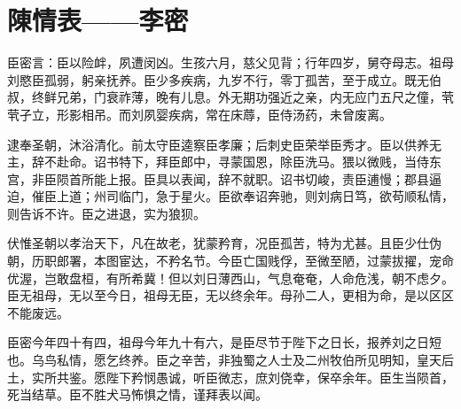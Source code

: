 \section{ 陳情表——李密}

臣密言：臣以险衅，夙遭闵凶。生孩六月，慈父见背；行年四岁，舅夺母志。祖母刘愍臣孤弱，躬亲抚养。臣少多疾病，九岁不行，零丁孤苦，至于成立。既无伯叔，终鲜兄弟，门衰祚薄，晚有儿息。外无期功强近之亲，内无应门五尺之僮，茕茕孑立，形影相吊。而刘夙婴疾病，常在床蓐，臣侍汤药，未曾废离。

逮奉圣朝，沐浴清化。前太守臣逵察臣孝廉；后刺史臣荣举臣秀才。臣以供养无主，辞不赴命。诏书特下，拜臣郎中，寻蒙国恩，除臣洗马。猥以微贱，当侍东宫，非臣陨首所能上报。臣具以表闻，辞不就职。诏书切峻，责臣逋慢；郡县逼迫，催臣上道；州司临门，急于星火。臣欲奉诏奔驰，则刘病日笃，欲苟顺私情，则告诉不许。臣之进退，实为狼狈。

伏惟圣朝以孝治天下，凡在故老，犹蒙矜育，况臣孤苦，特为尤甚。且臣少仕伪朝，历职郎署，本图宦达，不矜名节。今臣亡国贱俘，至微至陋，过蒙拔擢，宠命优渥，岂敢盘桓，有所希冀！但以刘日薄西山，气息奄奄，人命危浅，朝不虑夕。臣无祖母，无以至今日，祖母无臣，无以终余年。母孙二人，更相为命，是以区区不能废远。

臣密今年四十有四，祖母今年九十有六，是臣尽节于陛下之日长，报养刘之日短也。乌鸟私情，愿乞终养。臣之辛苦，非独蜀之人士及二州牧伯所见明知，皇天后土，实所共鉴。愿陛下矜悯愚诚，听臣微志，庶刘侥幸，保卒余年。臣生当陨首，死当结草。臣不胜犬马怖惧之情，谨拜表以闻。